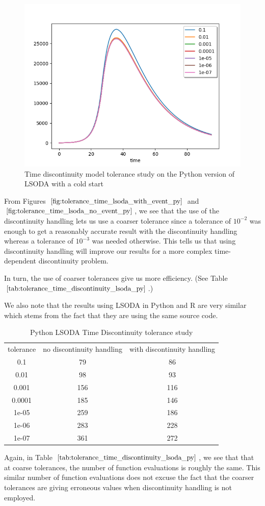 \begin{figure}[h]
\centering
\includegraphics[width=0.7\linewidth]{./figures/tolerance_time_lsoda_with_event_py}
\caption{Time discontinuity model tolerance study on the Python version of LSODA with a cold start}
\label{fig:tolerance_time_lsoda_with_event_py}
\end{figure}

From Figures $\ref{fig:tolerance_time_lsoda_with_event_py}$ and $\ref{fig:tolerance_time_lsoda_no_event_py}$, we see that the use of the discontinuity handling lets us use a coarser tolerance since a tolerance of $10^{-2}$ was enough to get a reasonably accurate result with the discontinuity handling whereas a tolerance of $10^{-3}$ was needed otherwise. This tells us that using discontinuity handling will improve our results for a more complex time-dependent discontinuity problem.

In turn, the use of coarser tolerances give us more efficiency. (See Table $\ref{tab:tolerance_time_discontinuity_lsoda_py}$.)

We also note that the results using LSODA in Python and R are very similar which stems from the fact that they are using the same source code.

\begin{table}[h]
\caption {Python LSODA Time Discontinuity tolerance study} \label{tab:tolerance_time_discontinuity_lsoda_py} 
\begin{center}
\begin{tabular}{ c c c }
tolerance & no discontinuity handling & with discontinuity handling \\ 
0.1 & 79 & 86 \\
0.01 & 98 & 93 \\
0.001 & 156 & 116 \\
0.0001 & 185 & 146 \\
1e-05 & 259 & 186 \\
1e-06 & 283 & 228 \\
1e-07 & 361 & 272 \\
\end{tabular}
\end{center}
\end{table}
Again, in Table $\ref{tab:tolerance_time_discontinuity_lsoda_py}$, we see that that at coarse tolerances, the number of function evaluations is roughly the same. This similar number of function evaluations does not excuse the fact that the coarser tolerances are giving erroneous values when discontinuity handling is not employed.

